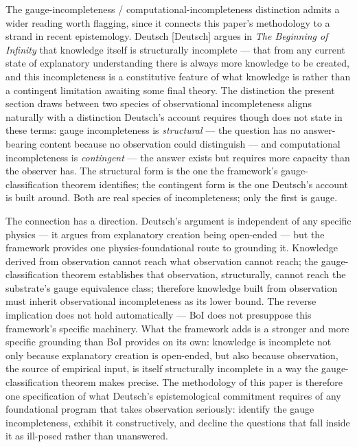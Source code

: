 \documentclass[
]{article}
\begin{document}
The gauge-incompleteness / computational-incompleteness distinction
admits a wider reading worth flagging, since it connects this paper's
methodology to a strand in recent epistemology. Deutsch {[}Deutsch{]}
argues in \emph{The Beginning of Infinity} that knowledge itself is
structurally incomplete --- that from any current state of explanatory
understanding there is always more knowledge to be created, and this
incompleteness is a constitutive feature of what knowledge is rather
than a contingent limitation awaiting some final theory. The distinction
the present section draws between two species of observational
incompleteness aligns naturally with a distinction Deutsch's account
requires though does not state in these terms: gauge incompleteness is
\emph{structural} --- the question has no answer-bearing content because
no observation could distinguish --- and computational incompleteness is
\emph{contingent} --- the answer exists but requires more capacity than
the observer has. The structural form is the one the framework's
gauge-classification theorem identifies; the contingent form is the one
Deutsch's account is built around. Both are real species of
incompleteness; only the first is gauge.

The connection has a direction. Deutsch's argument is independent of any
specific physics --- it argues from explanatory creation being
open-ended --- but the framework provides one physics-foundational route
to grounding it. Knowledge derived from observation cannot reach what
observation cannot reach; the gauge-classification theorem establishes
that observation, structurally, cannot reach the substrate's gauge
equivalence class; therefore knowledge built from observation must
inherit observational incompleteness as its lower bound. The reverse
implication does not hold automatically --- BoI does not presuppose this
framework's specific machinery. What the framework adds is a stronger
and more specific grounding than BoI provides on its own: knowledge is
incomplete not only because explanatory creation is open-ended, but also
because observation, the source of empirical input, is itself
structurally incomplete in a way the gauge-classification theorem makes
precise. The methodology of this paper is therefore one specification of
what Deutsch's epistemological commitment requires of any foundational
program that takes observation seriously: identify the gauge
incompleteness, exhibit it constructively, and decline the questions
that fall inside it as ill-posed rather than unanswered.
\end{document}
